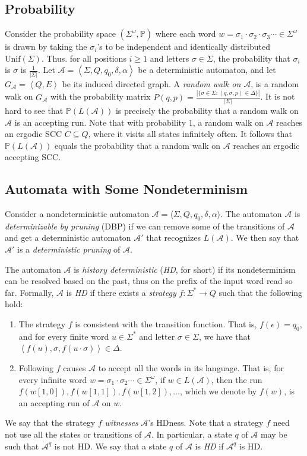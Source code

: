 \documentclass[10pt,a4paper]{amsart}
\theoremstyle{definition}
\numberwithin{equation}{section}
\newcommand{\A}{{\mathcal A}}
\newcommand{\zug}[1]{\left\langle #1 \right\rangle}
\renewcommand{\P}{\mathbb{P}}
\begin{document}
\subsection{Probability}
Consider the probability space $(\Sigma^\omega,\P)$ where each word $w=\sigma_1\cdot \sigma_2 \cdot \sigma_3\cdots \in \Sigma^\omega$ is drawn by taking the $\sigma_i$'s to be independent and identically distributed $\mathrm{Unif}(\Sigma)$. Thus. for all positions $i \geq 1$ and letters $\sigma \in \Sigma$, the probability that  $\sigma_i$ is $\sigma$ is $\frac{1}{|\Sigma|}$. Let $\A=\zug{\Sigma,Q,q_0,\delta,\alpha}$ be a deterministic automaton, and let $G_\A=\zug{Q,E}$ be its  induced directed graph. A \emph{random walk on $\A$}, is a random walk on $G_\A$ with the probability matrix $P(q,p)=\frac{|\{\sigma\in \Sigma : \zug{q,\sigma,p}\in \Delta\} |}{|\Sigma|}$. It is not hard to see that $\P(L(\A))$ is precisely the probability that a random walk on $\A$ is an accepting run. Note that with probability $1$, a random walk on $\A$ reaches an ergodic SCC $C\subseteq Q$, where it visits all states infinitely often. It follows that $\P(L(\A))$ equals the probability that a random walk on $\A$ reaches an ergodic accepting SCC.


\subsection{Automata with Some Nondeterminism}
\label{awsn}

Consider a nondeterministic automaton $\A = \langle \Sigma, Q, q_0, \delta, \alpha  \rangle$.
The automaton $\A$ is {\em determinizable by pruning} (DBP) if we can remove some of the transitions of $\A$ and get a deterministic automaton $\A'$ that recognizes $L(\A)$.  We then say that $\A'$ is a {\em deterministic pruning\/} of $\A$. 

The automaton $\A$ is \emph{history deterministic} (\emph{HD}, for short) if its nondeterminism can be resolved based on the past, thus on the prefix of the input word read so far. Formally, $\A$ is \emph{HD} if there exists a {\em strategy\/} $f:\Sigma^* \to Q$ such that the following hold: 
\begin{enumerate}
	\item 
	The strategy $f$ is consistent with the transition function. That is, $f(\epsilon)=q_0$, and for every finite word $u \in \Sigma^*$ and letter $\sigma \in \Sigma$, we have that $\zug{f(u),\sigma,f(u \cdot \sigma)} \in \Delta$. 
	\item
	Following $f$ causes $\A$ to accept all the words in its language. That is, for every infinite word $w = \sigma_1 \cdot \sigma_2 \cdots \in \Sigma^\omega$, if $w \in L(\A)$, then the run $f(w[1, 0]), f(w[1, 1]), f(w[1, 2]), \ldots$, which we denote by $f(w)$, is 
	an accepting run of $\A$ on $w$. 
\end{enumerate}
We say that the strategy $f$ \emph{witnesses} $\A$'s HDness. 
Note that a strategy $f$ need not use all the states or transitions of $\A$. 
In particular, a state $q$ of $\A$ may be such that $\A^q$ is not HD. We say that a state $q$ of $\A$ is \emph{HD} if $\A^q$ is HD.
\end{document}

